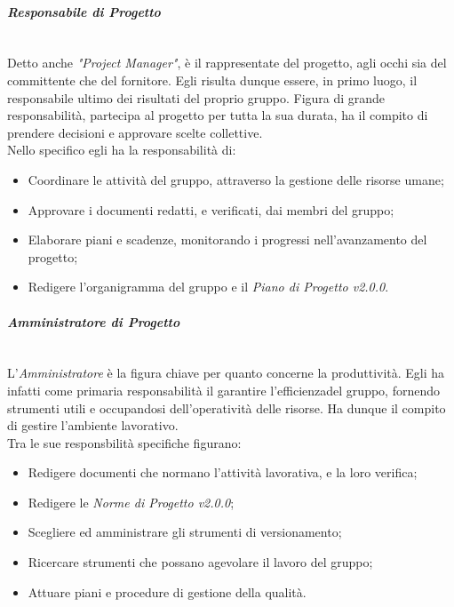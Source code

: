 \paragraph{\textit{Responsabile di Progetto}} ~\\
	Detto anche \textit{"Project Manager"}, è il rappresentate del progetto\glossario, agli occhi sia del committente che del 			fornitore. Egli risulta dunque essere, in primo luogo, il responsabile ultimo dei risultati del proprio gruppo. 			Figura di grande responsabilità, partecipa al progetto per tutta la sua durata, ha il compito di prendere 						decisioni 	e approvare scelte collettive.\\
	Nello specifico egli ha la responsabilità di:
	\begin{itemize}
	\item Coordinare le attività del gruppo, attraverso la gestione delle risorse umane;
	\item Approvare i documenti redatti, e verificati, dai membri del gruppo;
	\item Elaborare piani e scadenze, monitorando i progressi nell'avanzamento del progetto;
	\item Redigere l'organigramma del gruppo e il \textit{Piano di Progetto v2.0.0}.
	\end{itemize}

\paragraph{\textit{Amministratore di Progetto}} ~\\
	L'\textit{Amministratore} è la figura chiave per quanto concerne la produttività. Egli ha infatti come primaria 							responsabilità il garantire l'efficienza\glossario del gruppo, fornendo strumenti utili e occupandosi 								dell'operatività delle risorse. Ha dunque il compito di gestire l'ambiente lavorativo.\\
	Tra le sue responsbilità specifiche figurano:
	\begin{itemize}
	\item Redigere documenti che normano l'attività lavorativa, e la loro verifica;
	\item Redigere le \textit{Norme di Progetto v2.0.0};
	\item Scegliere ed amministrare gli strumenti di versionamento\glossario;
	\item Ricercare strumenti che possano agevolare il lavoro del gruppo;
	\item Attuare piani e procedure di gestione della qualità\glossario.
	\end{itemize}

